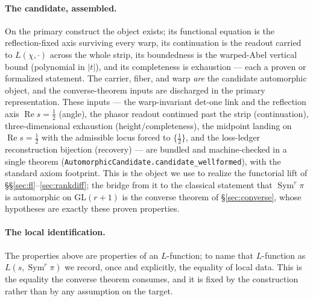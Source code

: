 \documentclass[11pt]{article}
\theoremstyle{definition}
\renewcommand{\Re}{\operatorname{Re}}
\newcommand{\Sym}{\operatorname{Sym}}
\begin{document}
\paragraph{The candidate, assembled.} On the primary construct the object exists; its functional
equation is the reflection-fixed axis surviving every warp, its continuation is the readout carried to
$L(\chi,\cdot)$ across the whole strip, its boundedness is the warped-Abel vertical bound (polynomial in
$|t|$), and its completeness is exhaustion --- each a proven or formalized statement. The carrier, fiber, and warp
\emph{are} the candidate automorphic object, and the converse-theorem inputs are discharged in the
primary representation. These inputs --- the warp-invariant det-one link and the reflection axis
$\Re s=\tfrac12$ (angle), the phasor readout continued past the strip (continuation), three-dimensional
exhaustion (height/completeness), the midpoint landing on $\Re s=\tfrac12$ with the admissible locus
forced to $\{\tfrac12\}$, and the loss-ledger reconstruction bijection (recovery) --- are bundled and
machine-checked in a single theorem (\texttt{AutomorphicCandidate.candidate\_wellformed}), with the
standard axiom footprint. This is the object we use to realize the functorial lift of
\S\S\ref{sec:fl}--\ref{sec:rankdiff}; the bridge from it to the classical statement that $\Sym^r\pi$ is
automorphic on $\mathrm{GL}(r+1)$ is the converse theorem of \S\ref{sec:converse}, whose hypotheses are
exactly these proven properties.

\paragraph{The local identification.} The properties above are properties of an $L$-function; to name
that $L$-function as $L(s,\Sym^r\pi)$ we record, once and explicitly, the equality of local data. This
is the equality the converse theorem consumes, and it is fixed by the construction rather than by any
assumption on the target.
\end{document}
